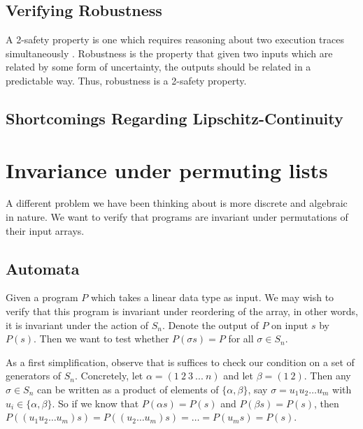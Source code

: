 \documentclass{llncs}
\begin{document}
\subsection{Verifying Robustness}

A 2-safety property is one which requires reasoning about two execution traces simultaneously \cite{terauchi05}.  Robustness is the property that given two inputs which are related by some form of uncertainty, the outputs should be related in a predictable way.  Thus, robustness is a 2-safety property.


\subsection{Shortcomings Regarding Lipschitz-Continuity}


\section{Invariance under permuting lists}
\label{permlists}

A different problem we have been thinking about is more discrete
and algebraic in nature.
We want to verify that programs are invariant under
permutations of their input arrays.

\subsection{Automata}
Given a program $P$ which takes a linear data type
as input. We may wish to verify that this program
is invariant under reordering of the array,
in other words, it is invariant under the action of $S_n$.
Denote the output of $P$ on input $s$ by $P(s)$.
Then we want to test whether $P(\sigma s) = P$
for all $\sigma \in S_n$.

As a first simplification, observe that is
suffices to check our condition on a set
of generators of $S_n$.
Concretely, let $\alpha = (1\ 2\ 3\ ...\ n)$
and let $\beta = (1\ 2)$.
Then any $\sigma \in S_n$ can be written as
a product of elements of $\{\alpha,\beta\}$,
say $\sigma = u_1 u_2\ldots u_m$ with
$u_i \in \{\alpha,\beta\}$.
So if we know that $P(\alpha s) = P(s)$
and $P(\beta s) = P(s)$, then
$P((u_1 u_2 \ldots u_m)s)
= P((u_2 \ldots u_m)s)
= \ldots = P(u_ms) = P(s) $.
\end{document}
